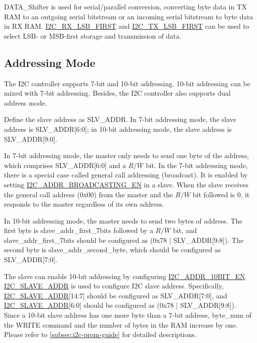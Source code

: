 \documentclass[main\_\_EN.tex]{subfiles}
\begin{document}
DATA\_Shifter is used for serial/parallel conversion, converting byte data in TX RAM to an outgoing serial bitstream or an incoming serial bitstream to byte data in RX RAM. \hyperref[fielddesc:I2CRXLSBFIRST]{I2C\_RX\_LSB\_FIRST} and \hyperref[fielddesc:I2CTXLSBFIRST]{I2C\_TX\_LSB\_FIRST} can be used to select LSB- or MSB-first storage and transmission of data.

\subsection{Addressing Mode}

The \chipname{} I2C controller supports 7-bit and 10-bit addressing. 10-bit addressing can be mixed with 7-bit addressing. Besides, the \chipname{} I2C controller also supports dual address mode.

Define the slave address as SLV\_ADDR. In 7-bit addressing mode, the slave address is SLV\_ADDR[6:0]; in 10-bit addressing mode, the slave address is SLV\_ADDR[9:0].

In 7-bit addressing mode, the master only needs to send one byte of the address, which comprises SLV\_ADDR[6:0] and a $R/\overline W$ bit. In the 7-bit addressing mode, there is a special case called general call addressing (broadcast). It is enabled by setting \hyperref[fielddesc:I2CADDRBROADCASTINGEN]{I2C\_ADDR\_BROADCASTING\_EN} in a slave. When the slave receives the general call address (0x00) from the master and the $R/\overline W$ bit followed is 0, it responds to the master regardless of its own address.

In 10-bit addressing mode, the master needs to send two bytes of address. The first byte is slave\_addr\_first\_7bits followed by a $R/\overline W$ bit, and slave\_addr\_first\_7bits should be configured as (0x78 | SLV\_ADDR[9:8]). The second byte is slave\_addr\_second\_byte, which should be configured as SLV\_ADDR[7:0].

The slave can enable 10-bit addressing by configuring \hyperref[fielddesc:I2CADDR10BITEN]{I2C\_ADDR\_10BIT\_EN}. \hyperref[fielddesc:I2CSLAVEADDR]{I2C\_SLAVE\_ADDR} is used to configure I2C slave address. Specifically, \hyperref[fielddesc:I2CSLAVEADDR]{I2C\_SLAVE\_ADDR}[14:7] should be configured as SLV\_ADDR[7:0], and  \hyperref[fielddesc:I2CSLAVEADDR]{I2C\_SLAVE\_ADDR}[6:0] should be configured as (0x78 | SLV\_ADDR[9:8]). Since a 10-bit slave address has one more byte than a 7-bit address, byte\_num of the WRITE command and the number of bytes in the RAM increase by one. Please refer to \ref{subsec:i2c-prom-guide} for detailed descriptions.
\end{document}
